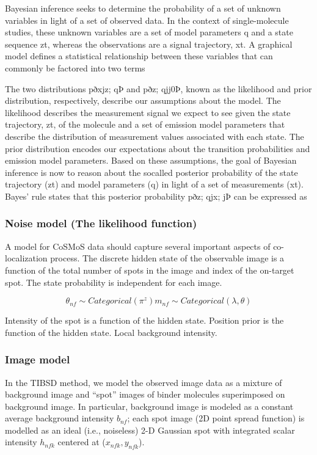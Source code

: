 Bayesian inference seeks to determine the probability of a set of unknown
variables in light of a set of observed data. In the context of single-molecule
studies, these unknown variables are a set of model parameters q and a state
sequence zt, whereas the observations are a signal trajectory, xt. A graphical
model defines a statistical relationship between these variables that can
commonly be factored into two terms

The two distributions pðxjz; qÞ and pðz; qjj0Þ, known as the likelihood and
prior distribution, respectively, describe our assumptions about the model.
The likelihood describes the measurement signal we expect to see given
the state trajectory, zt, of the molecule and a set of emission model parameters that describe the distribution of measurement values associated
with each state. The prior distribution encodes our expectations about the
transition probabilities and emission model parameters. Based on these assumptions, the goal of Bayesian inference is now to reason about the socalled posterior probability of the state trajectory (zt) and model parameters
(q) in light of a set of measurements (xt). Bayes’ rule states that this posterior probability pðz; qjx; jÞ can be expressed as

\subsubsection{Noise model (The likelihood function)}

A model for CoSMoS data should capture several important aspects of co-localization process. The discrete hidden state of the observable image is a function of the total number of spots in the image and index of the on-target spot. The state probability is independent for each image.

\begin{equation*}
    \theta_{nf} \sim Categorical(\pi^z)
    m_{nf} \sim Categorical(\lambda, \theta)
\end{equation*}

Intensity of the spot is a function of the hidden state. Position prior is the function of the hidden state. Local background intensity.

\subsubsection{Image model}

In the TIBSD method, we model the observed image data as a mixture of background image and “spot” images of binder molecules superimposed on background image. In particular, background image is modeled as a constant average background intensity $b_{nf}$; each spot image (2D point spread function) is modelled as an ideal (i.e., noiseless) 2-D Gaussian spot with integrated scalar intensity $h_{nfk}$ centered at ($x_{nfk}, y_{nfk}$).  

